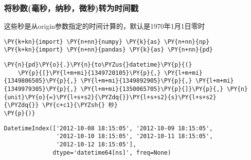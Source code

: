     \hypertarget{ux5c06ux79d2ux6570ux6bebux79d2ux7eb3ux79d2ux5faeux79d2ux8f6cux4e3aux65f6ux95f4ux6233}{%
\subsubsection{将秒数(毫秒，纳秒，微秒)转为时间戳}\label{ux5c06ux79d2ux6570ux6bebux79d2ux7eb3ux79d2ux5faeux79d2ux8f6cux4e3aux65f6ux95f4ux6233}}

    这些秒是从origin参数指定的时间计算的，默认是1970年1月1日零时

    \begin{tcolorbox}[breakable, size=fbox, boxrule=1pt, pad at break*=1mm,colback=cellbackground, colframe=cellborder]
\begin{Verbatim}[commandchars=\\\{\}]
\PY{k+kn}{import} \PY{n+nn}{numpy} \PY{k}{as} \PY{n+nn}{np}
\PY{k+kn}{import} \PY{n+nn}{pandas} \PY{k}{as} \PY{n+nn}{pd}
\end{Verbatim}
\end{tcolorbox}

    \begin{tcolorbox}[breakable, size=fbox, boxrule=1pt, pad at break*=1mm,colback=cellbackground, colframe=cellborder]
\begin{Verbatim}[commandchars=\\\{\}]
\PY{n}{pd}\PY{o}{.}\PY{n}{to\PYZus{}datetime}\PY{p}{(}
    \PY{p}{[}\PY{l+m+mi}{1349720105}\PY{p}{,} \PY{l+m+mi}{1349806505}\PY{p}{,} \PY{l+m+mi}{1349892905}\PY{p}{,} \PY{l+m+mi}{1349979305}\PY{p}{,} \PY{l+m+mi}{1350065705}\PY{p}{]}\PY{p}{,} \PY{n}{unit}\PY{o}{=}\PY{l+s+s2}{\PYZdq{}}\PY{l+s+s2}{s}\PY{l+s+s2}{\PYZdq{}} \PY{c+c1}{\PYZsh{} 秒}
\PY{p}{)}
\end{Verbatim}
\end{tcolorbox}

            \begin{tcolorbox}[breakable, size=fbox, boxrule=.5pt, pad at break*=1mm, opacityfill=0]
\begin{Verbatim}[commandchars=\\\{\}]
DatetimeIndex(['2012-10-08 18:15:05', '2012-10-09 18:15:05',
               '2012-10-10 18:15:05', '2012-10-11 18:15:05',
               '2012-10-12 18:15:05'],
              dtype='datetime64[ns]', freq=None)
\end{Verbatim}
\end{tcolorbox}
        

